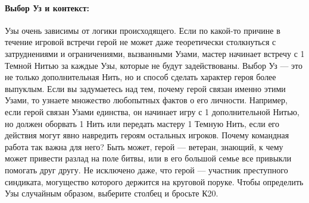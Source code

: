 \paragraph{Выбор Уз и контекст:} Узы очень зависимы от логики происходящего. Если по какой-то причине в течение игровой встречи герой не может даже теоретически столкнуться с затруднениями и ограничениями, вызванными Узами, мастер начинает встречу с 1 Темной Нитью за каждые Узы, которые не будут задействованы.
\newline
Выбор Уз — это не только дополнительная Нить, но и способ сделать характер героя более выпуклым. Если вы задумаетесь над тем, почему герой связан именно этими Узами, то узнаете множество любопытных фактов о его личности. Например, если герой связан Узами единства, он начинает игру с 1 дополнительной Нитью, но должен оборвать 1 Нить или передать мастеру 1 Темную Нить, если его действия могут явно навредить героям остальных игроков. Почему командная работа так важна для него? Быть может, герой — ветеран, знающий, к чему может привести разлад на поле битвы, или в его большой семье все привыкли помогать друг другу. Не исключено даже, что герой — участник преступного синдиката, могущество которого держится на круговой поруке.
\newline
Чтобы определить Узы случайным образом, выберите столбец и бросьте К20.

